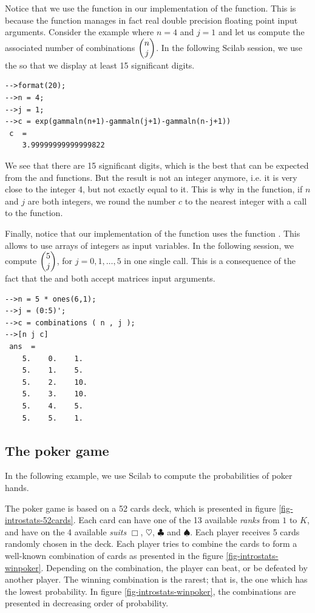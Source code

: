 Notice that we use the  function in our implementation of 
the  function. This is because the 
function manages in fact real double precision floating point input arguments. 
Consider the example where $n=4$ and $j=1$ and let us compute the 
associated number of combinations $\choosefun{n}{j}$.
In the following Scilab session, we use the  so that we display
at least 15 significant digits.
\lstset{language=scilabscript}
\begin{lstlisting}
-->format(20);
-->n = 4;
-->j = 1;
-->c = exp(gammaln(n+1)-gammaln(j+1)-gammaln(n-j+1))
 c  =
    3.99999999999999822  
\end{lstlisting}
We see that there are 15 significant digits, which is the best 
that can be expected from the  and 
functions. But the result is not an integer anymore, i.e. it is very
close to the integer 4, but not exactly equal to it. 
This is why in the  function, if $n$ and $j$ 
are both integers, we round the number $c$ to the nearest integer
with a call to the  function.

Finally, notice that our implementation of the  
function uses the function . This allows to use 
arrays of integers as input variables. In the following 
session, we compute $\choosefun{5}{j}$, for $j=0,1,\ldots,5$ 
in one single call. This is a consequence of the fact that the  
and  both accept matrices input arguments.
\lstset{language=scilabscript}
\begin{lstlisting}
-->n = 5 * ones(6,1);
-->j = (0:5)';
-->c = combinations ( n , j );
-->[n j c]
 ans  =
    5.    0.    1.   
    5.    1.    5.   
    5.    2.    10.  
    5.    3.    10.  
    5.    4.    5.   
    5.    5.    1.   
\end{lstlisting}

\subsection{The poker game}
In the following example, we use Scilab to compute the probabilities 
of poker hands.


The poker game is based on a 52 cards deck, which is presented in
figure \ref{fig-introstats-52cards}. Each card can have one of the 13 available \emph{ranks}
from $1$ to $K$, and have on the 4 available \emph{suits} $\Box$, $\heartsuit$, $\clubsuit$ and $\spadesuit$.
Each player receives 5 cards randomly chosen in the deck. Each player tries to combine the cards to 
form a well-known combination of cards as presented in the figure \ref{fig-introstats-winpoker}.
Depending on the combination, the player can beat, or be defeated by another player. 
The winning combination is the rarest; that is, the one which has the 
lowest probability. In figure \ref{fig-introstats-winpoker}, the combinations 
are presented in decreasing order of probability.

